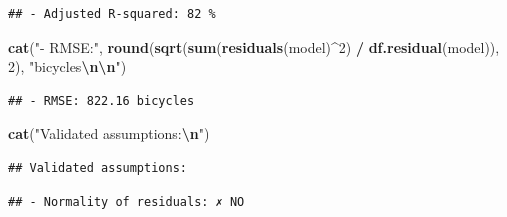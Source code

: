 \documentclass[
]{article}
\newenvironment{Shaded}{\begin{snugshade}}{\end{snugshade}}
\newcommand{\ControlFlowTok}[1]{\textcolor[rgb]{0.13,0.29,0.53}{\textbf{#1}}}
\newcommand{\DecValTok}[1]{\textcolor[rgb]{0.00,0.00,0.81}{#1}}
\newcommand{\FloatTok}[1]{\textcolor[rgb]{0.00,0.00,0.81}{#1}}
\newcommand{\FunctionTok}[1]{\textcolor[rgb]{0.13,0.29,0.53}{\textbf{#1}}}
\newcommand{\NormalTok}[1]{#1}
\newcommand{\SpecialCharTok}[1]{\textcolor[rgb]{0.81,0.36,0.00}{\textbf{#1}}}
\newcommand{\StringTok}[1]{\textcolor[rgb]{0.31,0.60,0.02}{#1}}
\begin{document}
\begin{verbatim}
## - Adjusted R-squared: 82 %
\end{verbatim}

\begin{Shaded}
\begin{Highlighting}[]
\FunctionTok{cat}\NormalTok{(}\StringTok{"{-} RMSE:"}\NormalTok{, }\FunctionTok{round}\NormalTok{(}\FunctionTok{sqrt}\NormalTok{(}\FunctionTok{sum}\NormalTok{(}\FunctionTok{residuals}\NormalTok{(model)}\SpecialCharTok{\^{}}\DecValTok{2}\NormalTok{) }\SpecialCharTok{/} \FunctionTok{df.residual}\NormalTok{(model)), }\DecValTok{2}\NormalTok{), }
    \StringTok{"bicycles}\SpecialCharTok{\textbackslash{}n\textbackslash{}n}\StringTok{"}\NormalTok{)}
\end{Highlighting}
\end{Shaded}

\begin{verbatim}
## - RMSE: 822.16 bicycles
\end{verbatim}

\begin{Shaded}
\begin{Highlighting}[]
\FunctionTok{cat}\NormalTok{(}\StringTok{"Validated assumptions:}\SpecialCharTok{\textbackslash{}n}\StringTok{"}\NormalTok{)}
\end{Highlighting}
\end{Shaded}

\begin{verbatim}
## Validated assumptions:
\end{verbatim}

\begin{Shaded}
\end{Shaded}

\begin{verbatim}
## - Normality of residuals: ✗ NO
\end{verbatim}

\begin{Shaded}
\end{Shaded}
\end{document}
